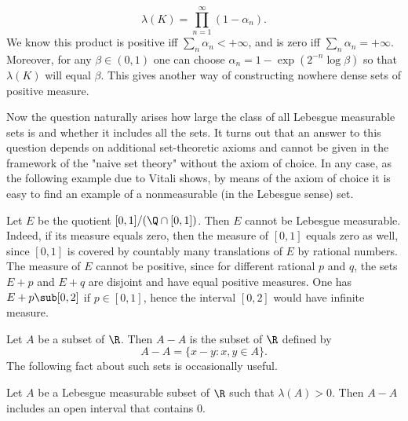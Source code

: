 \begin{example}
\[\lambda(K)=\prod_{n=1}^{\infty}(1-\alpha_n).\]
We know this product is positive iff $\sum_{n}\alpha_n<+\infty$, and is zero iff $\sum_n\alpha_n=+\infty$. Moreover, for any $\beta\in(0,1)$ one can choose $\alpha_n=1-\exp(2^{-n}\log\beta)$ so that $\lambda(K)$ will equal $\beta$. This gives another way of constructing nowhere dense sets of positive measure.
\end{example}
Now the question naturally arises how large the class of all Lebesgue measurable sets is and whether it includes all the sets. It turns out that an answer to this question depends on additional set-theoretic axioms and cannot be given in the framework of the "naive set theory" without the axiom of choice. In any case, as the following example due to Vitali shows, by means of the axiom of choice it is easy to find an example of a nonmeasurable (in the Lebesgue sense) set.
\begin{example}\label{not Lebesgue measurable set}
Let $E$ be the quotient $[0,1]/(\Q\cap[0,1])$. Then $E$ cannot be Lebesgue measurable. Indeed, if its measure equals zero, then the measure of $[0,1]$ equals zero as well, since $[0,1]$ is covered by countably many translations of $E$ by rational numbers. The measure of $E$ cannot be positive, since for different rational $p$ and $q$, the sets $E+p$ and $E+q$ are disjoint and have equal positive measures. One has $E+p\sub[0,2]$ if $p\in[0,1]$, hence the interval $[0,2]$ would have infinite measure.
\end{example}
Let $A$ be a subset of $\R$. Then $A-A$ is the subset of $\R$ defined by
\[A-A=\{x-y:x,y\in A\}.\]
The following fact about such sets is occasionally useful.
\begin{proposition}\label{measure positive set A-A}
Let $A$ be a Lebesgue measurable subset of $\R$ such that $\lambda(A)>0$. Then $A-A$ includes an open interval that contains $0$.
\end{proposition}
